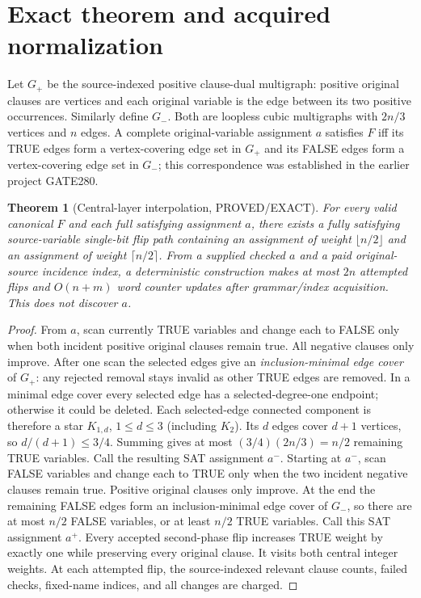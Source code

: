 \documentclass[11pt]{article}
\newtheorem{theorem}{Theorem}
\begin{document}
\section{Exact theorem and acquired normalization}
Let $G_+$ be the source-indexed positive clause-dual multigraph: positive original clauses are vertices and each original variable is the edge between its two positive occurrences. Similarly define $G_-$. Both are loopless cubic multigraphs with $2n/3$ vertices and $n$ edges. A complete original-variable assignment $a$ satisfies $F$ iff its TRUE edges form a vertex-covering edge set in $G_+$ and its FALSE edges form a vertex-covering edge set in $G_-$; this correspondence was established in the earlier project GATE280.
\begin{theorem}[Central-layer interpolation, PROVED/EXACT]
For every valid canonical $F$ and each full satisfying assignment $a$, there exists a fully satisfying source-variable single-bit flip path containing an assignment of weight $\lfloor n/2\rfloor$ and an assignment of weight $\lceil n/2\rceil$. From a supplied checked $a$ and a paid original-source incidence index, a deterministic construction makes at most $2n$ attempted flips and $O(n+m)$ word counter updates after grammar/index acquisition. This does not discover $a$.
\end{theorem}
\begin{proof}
From $a$, scan currently TRUE variables and change each to FALSE only when both incident positive original clauses remain true. All negative clauses only improve. After one scan the selected edges give an \emph{inclusion-minimal edge cover} of $G_+$: any rejected removal stays invalid as other TRUE edges are removed. In a minimal edge cover every selected edge has a selected-degree-one endpoint; otherwise it could be deleted. Each selected-edge connected component is therefore a star $K_{1,d}$, $1\le d\le3$ (including $K_2$). Its $d$ edges cover $d+1$ vertices, so $d/(d+1)\le3/4$. Summing gives at most $(3/4)(2n/3)=n/2$ remaining TRUE variables. Call the resulting SAT assignment $a^-$.
Starting at $a^-$, scan FALSE variables and change each to TRUE only when the two incident negative clauses remain true. Positive original clauses only improve. At the end the remaining FALSE edges form an inclusion-minimal edge cover of $G_-$, so there are at most $n/2$ FALSE variables, or at least $n/2$ TRUE variables. Call this SAT assignment $a^+$. Every accepted second-phase flip increases TRUE weight by exactly one while preserving every original clause. It visits both central integer weights. At each attempted flip, the source-indexed relevant clause counts, failed checks, fixed-name indices, and all changes are charged.
\end{proof}
\end{document}
